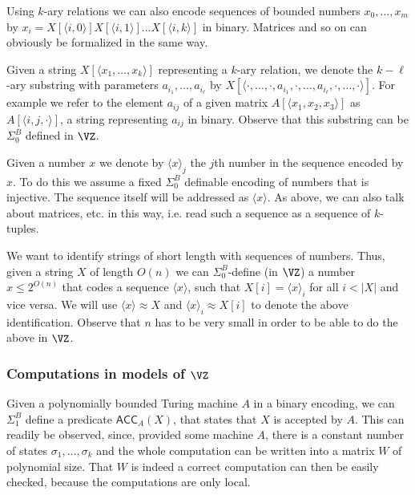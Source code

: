 \documentclass{LMCS}
\newcommand{\abs}[1]{\left\vert#1\right\vert}
\begin{document}
Using $k$-ary relations we can also encode sequences of bounded numbers $x_0,\dots,x_m$ by $x_i=X[\langle
i,0\rangle]X[\langle i,1\rangle]\dots X[\langle i,k\rangle]$ in binary. Matrices and so on can obviously be
formalized in the same way.

Given a string $X[\langle x_1,\dots, x_k\rangle]$ representing a $k$-ary relation, we denote the $k-\ell$-ary
substring with parameters $a_{i_1},\dots, a_{i_{\ell}}$ by $X[\langle
\cdot,\dots,\cdot,a_{i_1},\cdot,\dots,a_{i_{\ell}},\cdot,\dots,\cdot\rangle]$.
For example we refer to the element $a_{ij}$ of a given matrix $A[\langle
x_1,x_2,x_3\rangle]$ as $A[\langle i,j,\cdot\rangle]$, a string representing $a_{ij}$ in binary. Observe that
this substring can be $\Sigma^B_0$ defined in $\VZ$.

Given a number $x$ we denote by $\langle x\rangle_j$ the $j$th number in the  sequence encoded by $x$. To do
this we assume a fixed $\Sigma^B_0$ definable encoding of numbers that is injective. The sequence itself will be
addressed as $\langle x\rangle$. As above, we can also talk about matrices, etc. in this way, i.e. read such a
sequence as a sequence of $k$-tuples.

We want to identify strings of short length with sequences of numbers. Thus, given a string $X$ of length $O(n)$
we can $\Sigma^B_0$-define (in $\VZ$) a number $x\leq 2^{O(n)}$ that codes a sequence $\langle x\rangle$, such
that $X[i]=\langle x\rangle_i$ for all $i<\abs{X}$ and vice versa. We will use $\langle x\rangle\approx X$ and
$\langle x\rangle_i\approx X[i]$ to denote the above identification. Observe that $n$ has to be very small in
order to be able to do the above in $\VZ$.


\subsubsection{Computations in models of $\VZ$}\label{Secsub:Comp in VZ}

Given a polynomially bounded Turing machine $A$ in a binary encoding, we can $\Sigma^B_1$ define a predicate
$\mathsf{ACC}_A(X)$, that states that $X$ is accepted by $A$. This can readily be observed, since, provided some
machine $A$, there is a constant number of states $\sigma_1,\dots, \sigma_k$ and the whole computation can be
written into a matrix $W$ of polynomial size. That $W$ is indeed a correct computation can then be easily
checked, because the computations are only local.
\end{document}
